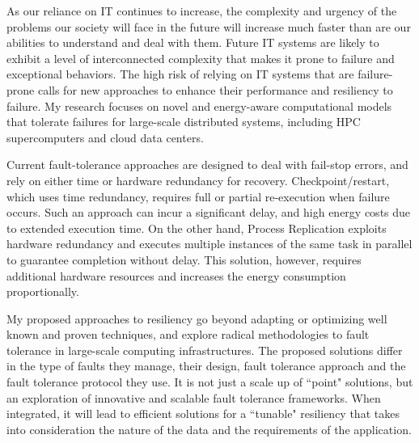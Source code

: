 As our reliance on IT continues to increase, the complexity and urgency of the problems our society will face in the future will increase much faster than are our abilities to understand and deal with them. Future IT systems are likely to exhibit a level of interconnected complexity that makes it prone to failure and exceptional behaviors. The high risk of relying on IT systems that are failure-prone calls for new approaches to enhance their performance and resiliency to failure. My research focuses on novel and energy-aware computational models that tolerate failures for large-scale distributed systems, including HPC supercomputers and cloud data centers.

Current fault-tolerance approaches are designed to deal with fail-stop errors, and rely on either time or hardware redundancy for recovery. Checkpoint/restart, which
uses time redundancy, requires full or partial re-execution when failure occurs. 
Such an approach
can incur a significant delay, %
and high energy costs due to extended execution time.
On the other hand, Process Replication exploits hardware redundancy and executes multiple
instances of the same task in parallel to guarantee completion without delay.  %
This solution,
however, requires additional hardware resources and increases the energy consumption proportionally. 


My proposed approaches to resiliency go beyond adapting or optimizing well known and proven techniques, and explore radical methodologies to fault tolerance in large-scale computing infrastructures. The proposed solutions differ in the type of faults they manage, their design, fault tolerance approach and the fault tolerance protocol they use. It is not just a scale up of  ``point" solutions, but an exploration of innovative and scalable fault tolerance frameworks. When integrated, it will lead to efficient solutions for a ``tunable" resiliency that takes into consideration the nature of the data and the requirements of the application.

